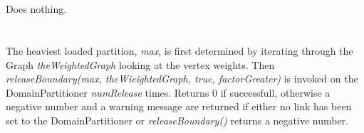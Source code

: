  \\
  \\ 
Does nothing. \\

 \\
 \\ 
The heaviest loaded partition, {\em max}, is first determined by
iterating through the Graph {\em theWeightedGraph} looking at the
vertex weights. Then {\em releaseBoundary(max, theWieightedGraph,
true, factorGreater)} is invoked on the
DomainPartitioner {\em numRelease} times. Returns $0$ if successfull,
otherwise a negative number and a warning message are returned if
either no link has been set to the DomainPartitioner or {\em
releaseBoundary()} returns a negative number. \\



